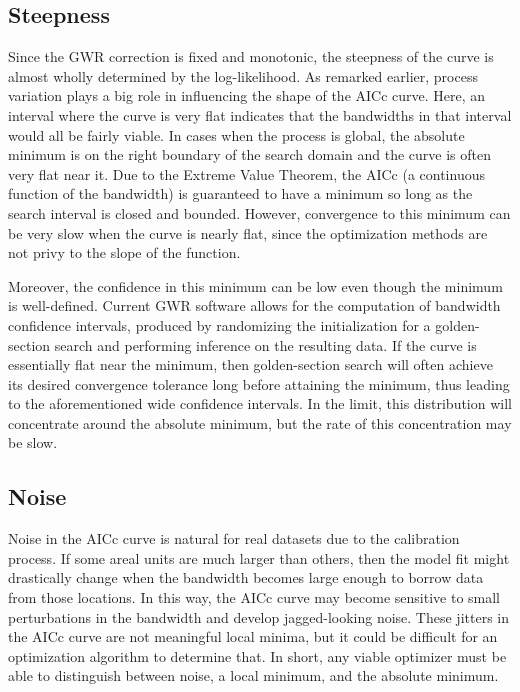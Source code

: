 \documentclass[letterpaper,12pt,twocolumn]{article}
\begin{document}
\subsection{Steepness}
Since the GWR correction is fixed and monotonic, the steepness of the curve is almost wholly determined by the log-likelihood. As remarked earlier, process variation plays a big role in influencing the shape of the AICc curve. Here, an interval where the curve is very flat indicates that the bandwidths in that interval would all be fairly viable. In cases when the process is global, the absolute minimum is on the right boundary of the search domain and the curve is often very flat near it. Due to the Extreme Value Theorem, the AICc (a continuous function of the bandwidth) is guaranteed to have a minimum so long as the search interval is closed and bounded. However, convergence to this minimum can be very slow when the curve is nearly flat, since the optimization methods are not privy to the slope of the function.

Moreover, the confidence in this minimum can be low even though the minimum is well-defined. Current GWR software allows for the computation of bandwidth confidence intervals, produced by randomizing the initialization for a golden-section search and performing inference on the resulting data. If the curve is essentially flat near the minimum, then golden-section search will often achieve its desired convergence tolerance long before attaining the minimum, thus leading to the aforementioned wide confidence intervals. In the limit, this distribution will concentrate around the absolute minimum, but the rate of this concentration may be slow. 

\subsection{Noise}
\label{sec:problem-noise}
Noise in the AICc curve is natural for real datasets due to the calibration process. If some areal units are much larger than others, then the model fit might drastically change when the bandwidth becomes large enough to borrow data from those locations. In this way, the AICc curve may become sensitive to small perturbations in the bandwidth and develop jagged-looking noise. These jitters in the AICc curve are not meaningful local minima, but it could be difficult for an optimization algorithm to determine that. In short, any viable optimizer must be able to distinguish between noise, a local minimum, and the absolute minimum.
\end{document}
